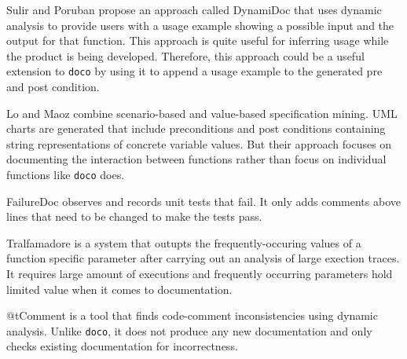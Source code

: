 Sulir and Poruban \cite{Sulir:2017} propose an approach called DynamiDoc that uses dynamic analysis to provide users with a usage example showing a possible input and the output for that function. This approach is quite useful for inferring usage while the product is being developed. Therefore, this approach could be a useful extension to \texttt{doco} by using it to append a usage example to the generated pre and post condition.

Lo and Maoz \cite{Lo:2010} combine scenario-based and value-based specification mining.
UML charts are generated that include preconditions and post conditions containing string representations
of concrete variable values. But their approach focuses on documenting the interaction between functions rather than focus on individual functions like \texttt{doco} does.

FailureDoc \cite{SaiZhang:2011} observes and records unit tests that fail. It only adds comments above lines that need to be changed to make the tests pass.

Tralfamadore \cite{Lefebvre:2012} is a system that outupts the frequently-occuring values of a function specific parameter after carrying out an analysis of large exection traces. It requires large amount of executions and frequently occurring parameters hold limited value when it comes to documentation.  

@tComment \cite{Tan:2012} is a tool that finds code-comment inconsistencies using dynamic analysis.
Unlike \texttt{doco}, it does not produce any new documentation and only checks existing documentation for incorrectness.
